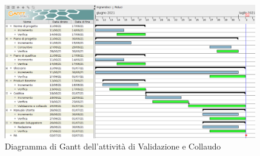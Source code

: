 

\begin{figure}[!ht]
    \caption{Diagramma di Gantt dell'attività di Validazione e Collaudo}
    \vspace{5px}
    \includegraphics[scale=0.3]{../../../Images/Diagrammi/Gantt/validazione_v2.png}
    \centering
\end{figure}